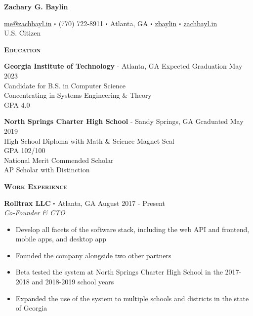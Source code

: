 \documentclass{article}
\newcommand\sbullet[1][.5]{\mathbin{\vcenter{\hbox{\scalebox{#1}{$\bullet$}}}}}
\begin{document}
  \begin{center}
    {\LARGE \textbf{Zachary G. Baylin}}

    \href{mailto:me@zachbayl.in}{\faEnvelope \hspace{1pt} me@zachbayl.in} $\sbullet$ \faPhone \hspace{1pt} (770) 722-8911 $\sbullet$  Atlanta, GA $\sbullet$ \href{https://linkedin.com/in/zbaylin}{\faLinkedin \hspace{1pt} zbaylin} $\sbullet$ \href{http://zachbayl.in}{\faGlobeAmericas \hspace{1pt} zachbayl.in}\\
    U.S. Citizen
  \end{center}
  {\large \textbf{\textsc{Education}}}\hspace{5pt}\xrfill[.5ex]{.4pt}

  \vspace{3pt}

  \textbf{Georgia Institute of Technology} - Atlanta, GA \hspace*{\fill}Expected Graduation May 2023\\
  Candidate for B.S. in Computer Science\\
  Concentrating in Systems Engineering \& Theory\\
  GPA 4.0
  
  \vspace{5pt}

  \textbf{North Springs Charter High School} - Sandy Springs, GA \hspace*{\fill}Graduated May 2019\\
  High School Diploma with Math \& Science Magnet Seal\\
  GPA 102/100\\
  National Merit Commended Scholar\\
  AP Scholar with Distinction

  \vspace{10pt}

  {\large \textbf{\textsc{Work Experience}}}\hspace{5pt}\xrfill[.5ex]{.4pt}

  \vspace{3pt}

  \textbf{Rolltrax LLC} $\sbullet$ Atlanta, GA \hspace*{\fill} August 2017 - Present\\
  \textit{Co-Founder \& CTO}
  \begin{itemize}
    \item Develop all facets of the software stack, including the web API and frontend, mobile apps, and desktop app
    \item Founded the company alongside two other partners
    \item Beta tested the system at North Springs Charter High School in the 2017-2018 and 2018-2019 school years
    \item Expanded the use of the system to multiple schools and districts in the state of Georgia 
  \end{itemize}
\end{document}
